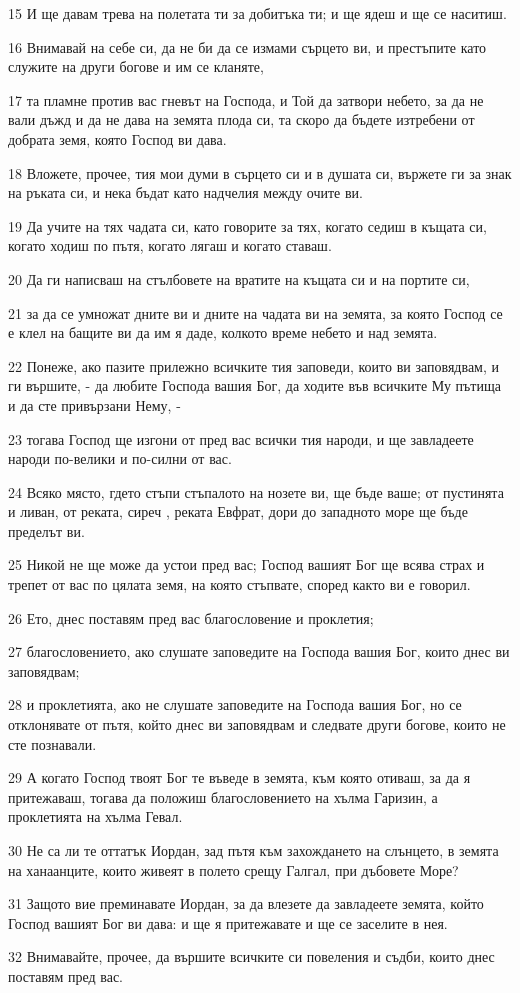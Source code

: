 \par 15 И ще давам трева на полетата ти за добитъка ти; и ще ядеш и ще се наситиш.
\par 16 Внимавай на себе си, да не би да се измами сърцето ви, и престъпите като служите на други богове и им се кланяте,
\par 17 та пламне против вас гневът на Господа, и Той да затвори небето, за да не вали дъжд и да не дава на земята плода си, та скоро да бъдете изтребени от добрата земя, която Господ ви дава.
\par 18 Вложете, прочее, тия мои думи в сърцето си и в душата си, вържете ги за знак на ръката си, и нека бъдат като надчелия между очите ви.
\par 19 Да учите на тях чадата си, като говорите за тях, когато седиш в къщата си, когато ходиш по пътя, когато лягаш и когато ставаш.
\par 20 Да ги написваш на стълбовете на вратите на къщата си и на портите си,
\par 21 за да се умножат дните ви и дните на чадата ви на земята, за която Господ се е клел на бащите ви да им я даде, колкото време небето и над земята.
\par 22 Понеже, ако пазите прилежно всичките тия заповеди, които ви заповядвам, и ги вършите, - да любите Господа вашия Бог, да ходите във всичките Му пътища и да сте привързани Нему, -
\par 23 тогава Господ ще изгони от пред вас всички тия народи, и ще завладеете народи по-велики и по-силни от вас.
\par 24 Всяко място, гдето стъпи стъпалото на нозете ви, ще бъде ваше; от пустинята и ливан, от реката, сиреч , реката Евфрат, дори до западното море ще бъде пределът ви.
\par 25 Никой не ще може да устои пред вас; Господ вашият Бог ще всява страх и трепет от вас по цялата земя, на която стъпвате, според както ви е говорил.
\par 26 Ето, днес поставям пред вас благословение и проклетия;
\par 27 благословението, ако слушате заповедите на Господа вашия Бог, които днес ви заповядвам;
\par 28 и проклетията, ако не слушате заповедите на Господа вашия Бог, но се отклонявате от пътя, който днес ви заповядвам и следвате други богове, които не сте познавали.
\par 29 А когато Господ твоят Бог те въведе в земята, към която отиваш, за да я притежаваш, тогава да положиш благословението на хълма Гаризин, а проклетията на хълма Гевал.
\par 30 Не са ли те оттатък Иордан, зад пътя към захождането на слънцето, в земята на ханаанците, които живеят в полето срещу Галгал, при дъбовете Море?
\par 31 Защото вие преминавате Иордан, за да влезете да завладеете земята, който Господ вашият Бог ви дава: и ще я притежавате и ще се заселите в нея.
\par 32 Внимавайте, прочее, да вършите всичките си повеления и съдби, които днес поставям пред вас.

